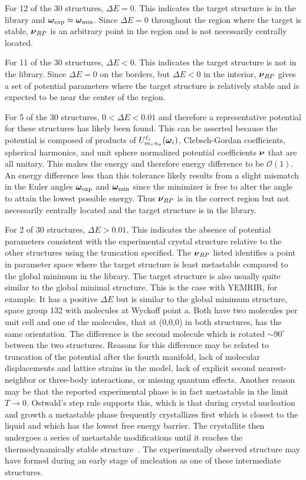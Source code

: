 \documentclass[preprint]{revtex4}
\newcommand{\mb}[1]{\ensuremath{\mbox{\boldmath $ #1 $}}}
\begin{document}
For 12 of the 30 structures, $\Delta E=0$.  This indicates the
target structure is in the library and
$\mb{\omega}_{\mathrm{exp}}\approx \mb{\omega}_{\mathrm{min}}$.
Since $\Delta E=0$ throughout the region where the target is stable,
$\mb{\nu}_{RP}$ is an arbitrary point in the region and is not
necessarily centrally located.

For 11 of the 30 structures, $\Delta E<0$. This indicates the target
structure is not in the library.  Since $\Delta E=0$ on the borders,
but $\Delta E<0$ in the interior, $\mb{\nu}_{RP}$ gives a set of
potential parameters where the target structure is relatively stable
and is expected to be near the center of the region.

For 5 of the 30 structures, $0< \Delta E < 0.01$ and therefore a
representative potential for these structures has likely been found.
This can be asserted because the potential is composed of products
of $U^{\ell_i}_{m_\tau n_\sigma}(\mb{\omega}_i)$, Clebsch-Gordan
coefficients, spherical harmonics, and unit sphere normalized
potential coefficients $\mb{\nu}$ that are all unitary.  This makes
the energy and therefore energy difference to be $\mathcal{O}(1)$.
An energy difference less than this tolerance likely results from a
slight mismatch in the Euler angles $\mb{\omega}_{\mathrm{exp}}$ and
$\mb{\omega}_{\mathrm{min}}$ since the minimizer is free to alter
the angle to attain the lowest possible energy.  Thus
$\mb{\nu}_{RP}$ is in the correct region but not necessarily
centrally located and the target structure is in the library.

For 2 of 30 structures, $\Delta E > 0.01$.  This indicates the
absence of potential parameters consistent with the experimental
crystal structure relative to the other structures using the
truncation specified.  The $\mb{\nu}_{RP}$ listed identifies a point
in parameter space where the target structure is least metastable
compared to the global minimum in the library.  The target structure
is also usually quite similar to the global minimal structure. This
is the case with YEMRIR, for example. It has a positive $\Delta E$
but is similar to the global minimum structure, space group 132 with
molecules at Wyckoff point a. Both have two molecules per unit cell
and one of the molecules, that at (0,0,0) in both structures, has
the same orientation.  The difference is the second molecule which
is rotated $\sim 90^\circ$ between the two structures. Reasons for
this difference may be related to truncation of the potential after
the fourth manifold, lack of molecular displacements and lattice
strains in the model, lack of explicit second nearest-neighbor or
three-body interactions, or missing quantum effects.  Another reason
may be that the reported experimental phase is in fact metastable in
the limit $T\rightarrow 0$. Ostwald's step rule supports this, which
is that during crystal nucleation and growth a metastable phase
frequently crystallizes first which is closest to the liquid and
which has the lowest free energy barrier. The crystallite then
undergoes a series of metastable modifications until it reaches the
thermodynamically stable structure~\cite{Schmalzried03}. The
experimentally observed structure may have formed during an early
stage of nucleation as one of these intermediate structures.
\end{document}

